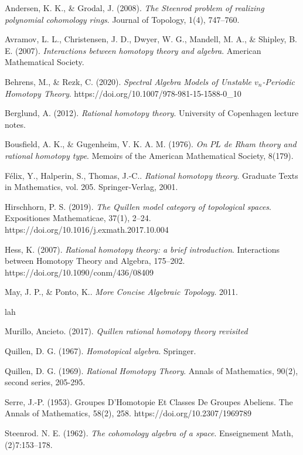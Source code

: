 \documentclass[psamsfonts]{amsart}
\theoremstyle{definition}
\numberwithin{equation}{section}
\begin{document}
\newpage
\begin{thebibliography}{9}

Andersen, K. K., \& Grodal, J. (2008). \textit{The Steenrod problem of realizing polynomial cohomology rings}. Journal of Topology, 1(4), 747–760.

Avramov, L. L., Christensen, J. D., Dwyer, W. G., Mandell, M. A., \& Shipley, B. E. (2007). \textit{Interactions between homotopy theory and algebra}. American Mathematical Society.

Behrens, M., \& Rezk, C. (2020). \textit{Spectral Algebra Models of Unstable $v_n$-Periodic Homotopy Theory}. https://doi.org/10.1007/978-981-15-1588-0\_10 

Berglund, A. (2012). \textit{Rational homotopy theory}. University of Copenhagen lecture notes.

 Bousfield, A. K., \& Gugenheim, V. K. A. M. (1976). \textit{On $PL$ de Rham theory and rational homotopy type}. Memoirs of the American Mathematical Society, 8(179).

Félix, Y., Halperin, S., Thomas, J.-C.. \textit{Rational homotopy theory}. Graduate Texts in Mathematics, vol. 205. Springer-Verlag, 2001.


Hirschhorn, P. S. (2019). \textit{The Quillen model category of topological spaces}. Expositiones Mathematicae, 37(1), 2–24. https://doi.org/10.1016/j.exmath.2017.10.004 

Hess, K. (2007). \textit{Rational homotopy theory: a brief introduction}. Interactions between Homotopy Theory and Algebra, 175–202. https://doi.org/10.1090/conm/436/08409

May, J. P., \& Ponto, K.. \textit{More Concise Algebraic Topology}. 2011.

 lah

 Murillo, Ancieto. (2017). \textit{Quillen rational homotopy theory revisited}

 Quillen, D. G. (1967). \textit{Homotopical algebra}. Springer. 

 Quillen, D. G. (1969). \textit{Rational Homotopy Theory}. Annals of Mathematics, 90(2), second series, 205-295.

Serre, J.-P. (1953). Groupes D'Homotopie Et Classes De Groupes Abeliens. The Annals of Mathematics, 58(2), 258. https://doi.org/10.2307/1969789 

Steenrod. N. E. (1962). \textit{The cohomology algebra of a space}. Enseignement Math, (2)7:153–178.

\end{thebibliography}
\end{document}
